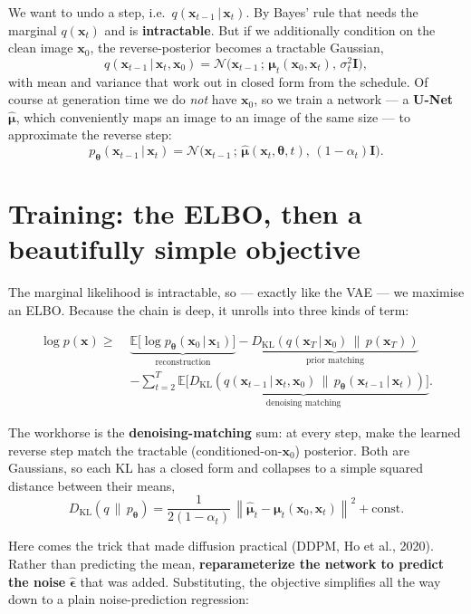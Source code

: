 \documentclass[11pt, oneside]{book}
\newcommand{\E}{\mathbb{E}}              %
\newcommand{\KL}[2]{D_{\mathrm{KL}}\!\left(#1 \,\|\, #2\right)}
\newcommand{\norm}[1]{\left\lVert #1 \right\rVert}
\newcommand{\eye}{\mathbf{I}}
\newcommand{\params}{\boldsymbol{\theta}}
\newcommand{\xvec}{\mathbf{x}}
\newcommand{\Normal}{\mathcal{N}}
\newcommand{\given}{\,\vert\,}
\begin{document}
We want to undo a step, i.e.\ $q(\xvec_{t-1}\given\xvec_t)$. By Bayes' rule that
needs the marginal $q(\xvec_t)$ and is \textbf{intractable}. But if we
additionally condition on the clean image $\xvec_0$, the reverse-posterior becomes a
tractable Gaussian,
\[
  q(\xvec_{t-1}\given\xvec_t,\xvec_0)
  = \Normal\!\bigl(\xvec_{t-1}\,;\,\boldsymbol{\mu}_t(\xvec_0,\xvec_t),\,\sigma_t^2\eye\bigr),
\]
with mean and variance that work out in closed form from the schedule. Of course at
generation time we do \emph{not} have $\xvec_0$, so we train a network ---
a \textbf{U-Net} $\hat{\boldsymbol{\mu}}$, which conveniently maps an image to an
image of the same size --- to approximate the reverse step:
\[
  p_{\params}(\xvec_{t-1}\given\xvec_t)
  = \Normal\!\bigl(\xvec_{t-1}\,;\,\hat{\boldsymbol{\mu}}(\xvec_t,\params,t),\,(1-\alpha_t)\eye\bigr).
\]

\section{Training: the ELBO, then a beautifully simple objective}

The marginal likelihood is intractable, so --- exactly like the VAE --- we maximise
an ELBO. Because the chain is deep, it unrolls into three kinds of term:

\begin{thmbox}[title={Diffusion ELBO}]
\[
\begin{aligned}
  \log p(\xvec) \ge\;
  & \underbrace{\E\bigl[\log p_{\params}(\xvec_0\given\xvec_1)\bigr]}_{\text{reconstruction}}
   - \underbrace{\KL{q(\xvec_T\given\xvec_0)}{p(\xvec_T)}}_{\text{prior matching}} \\
  & - \sum_{t=2}^{T}\underbrace{\E\bigl[\KL{q(\xvec_{t-1}\given\xvec_t,\xvec_0)}{p_{\params}(\xvec_{t-1}\given\xvec_t)}\bigr]}_{\text{denoising matching}}.
\end{aligned}
\]
\end{thmbox}

The workhorse is the \textbf{denoising-matching} sum: at every step, make the
learned reverse step match the tractable (conditioned-on-$\xvec_0$) posterior. Both
are Gaussians, so each KL has a closed form and collapses to a simple squared
distance between their means,
\[
  \KL{q}{p_{\params}} = \frac{1}{2(1-\alpha_t)}\,
    \norm{\hat{\boldsymbol{\mu}}_t - \boldsymbol{\mu}_t(\xvec_0,\xvec_t)}^2 + \text{const}.
\]

Here comes the trick that made diffusion practical (DDPM, Ho et al., 2020).
Rather than predicting the mean, \textbf{reparameterize the network to predict the
noise} $\hat{\boldsymbol{\epsilon}}$ that was added. Substituting, the objective
simplifies all the way down to a plain noise-prediction regression:
\end{document}
